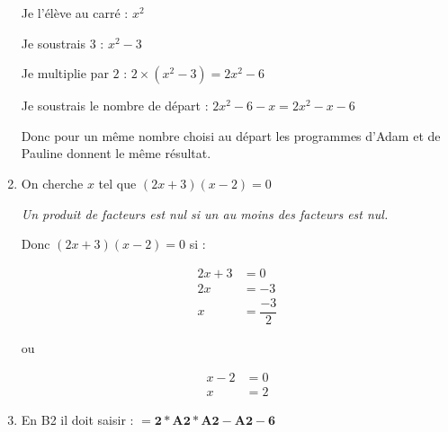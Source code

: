 \begin{enumerate}
	Je l’élève au carré : $x^2$
	
	Je soustrais $3$ : $x^2-3$
	
	Je multiplie par $2$ : $2\times (x^2-3) = 2x^2-6$
	
	Je soustrais le nombre de départ : $2x^2-6-x= 2x^2-x-6$
	
Donc pour un même nombre choisi au départ les programmes d’Adam et de Pauline donnent le même résultat.

\item On cherche $x$ tel que $(2x+3)(x-2)=0$

\textit{Un produit de facteurs est nul si un au moins des facteurs est nul.}

Donc $(2x+3)(x-2)=0$ si :
\begin{minipage}{4cm}
\begin{align*}
2x+3 &= 0\\
2x &=-3\\
x &= \dfrac{-3}{2}
\end{align*}
\end{minipage}
\begin{minipage}{1cm}
ou
\end{minipage}
\begin{minipage}{4cm}
\begin{align*}
x-2 &=0\\
x &= 2
\end{align*}
\end{minipage}


\item En B2 il doit saisir : $\mathbf{= 2*A2*A2 - A2 - 6}$
\end{enumerate}